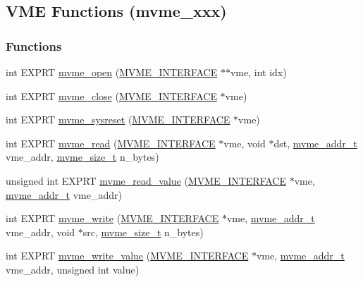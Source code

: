 \subsection{VME Functions (mvme\_\-xxx)}
\label{group__mvmestdfunctionh}
\subsubsection*{Functions}
\begin{DoxyCompactItemize}
\item 
int EXPRT \hyperlink{group__mvmestdfunctionh_ga13db7fc7c7c022e46fadd8fc4dc40047}{mvme\_\-open} (\hyperlink{structMVME__INTERFACE}{MVME\_\-INTERFACE} $\ast$$\ast$vme, int idx)
\item 
int EXPRT \hyperlink{group__mvmestdfunctionh_gab4010bb5ccbba1cdfb05307479b970b5}{mvme\_\-close} (\hyperlink{structMVME__INTERFACE}{MVME\_\-INTERFACE} $\ast$vme)
\item 
int EXPRT \hyperlink{group__mvmestdfunctionh_ga176cf77674a46bbef7ec446b4344bce2}{mvme\_\-sysreset} (\hyperlink{structMVME__INTERFACE}{MVME\_\-INTERFACE} $\ast$vme)
\item 
int EXPRT \hyperlink{group__mvmestdfunctionh_ga27a06319b3078fbabea16941721d7877}{mvme\_\-read} (\hyperlink{structMVME__INTERFACE}{MVME\_\-INTERFACE} $\ast$vme, void $\ast$dst, \hyperlink{group__mvmestdinclude_ga589085bbef4f3f52d4a39a316d743e05}{mvme\_\-addr\_\-t} vme\_\-addr, \hyperlink{group__mvmestdinclude_ga01d0cfb7d3dd7f89dee14b82d6cd4c3b}{mvme\_\-size\_\-t} n\_\-bytes)
\item 
unsigned int EXPRT \hyperlink{group__mvmestdfunctionh_ga5cab05257f96039738eec34ec330e0d8}{mvme\_\-read\_\-value} (\hyperlink{structMVME__INTERFACE}{MVME\_\-INTERFACE} $\ast$vme, \hyperlink{group__mvmestdinclude_ga589085bbef4f3f52d4a39a316d743e05}{mvme\_\-addr\_\-t} vme\_\-addr)
\item 
int EXPRT \hyperlink{group__mvmestdfunctionh_gab246e52895227ad3910ac7816801a73b}{mvme\_\-write} (\hyperlink{structMVME__INTERFACE}{MVME\_\-INTERFACE} $\ast$vme, \hyperlink{group__mvmestdinclude_ga589085bbef4f3f52d4a39a316d743e05}{mvme\_\-addr\_\-t} vme\_\-addr, void $\ast$src, \hyperlink{group__mvmestdinclude_ga01d0cfb7d3dd7f89dee14b82d6cd4c3b}{mvme\_\-size\_\-t} n\_\-bytes)
\item 
int EXPRT \hyperlink{group__mvmestdfunctionh_ga901e510ac4c207e424e944ee92c5ea65}{mvme\_\-write\_\-value} (\hyperlink{structMVME__INTERFACE}{MVME\_\-INTERFACE} $\ast$vme, \hyperlink{group__mvmestdinclude_ga589085bbef4f3f52d4a39a316d743e05}{mvme\_\-addr\_\-t} vme\_\-addr, unsigned int value)
$$
\end{DoxyCompactItemize}
